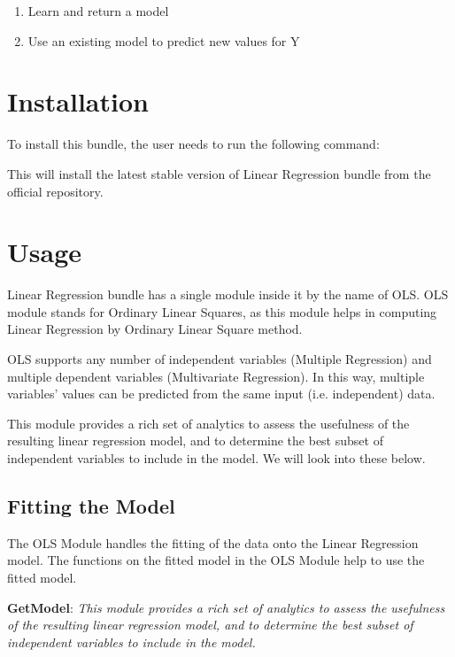 \begin{enumerate}
    \item Learn and return a model
    \item Use an existing model to predict new values for Y
\end{enumerate}

\section{Installation}

To install this bundle, the user needs to run the following command:



This will install the latest stable version of Linear Regression bundle from the official repository.

\section{Usage}

Linear Regression bundle has a single module inside it by the name of OLS. OLS module stands for Ordinary Linear Squares, as this module helps in computing Linear Regression by Ordinary Linear Square method.

OLS supports any number of independent variables (Multiple Regression) and multiple dependent variables (Multivariate Regression). In this way, multiple variables’ values can be predicted from the same input (i.e. independent) data.

This module provides a rich set of analytics to assess the usefulness of the resulting linear regression model, and to determine the best subset of independent variables to include in the model. We will look into these below.

\pagebreak

\subsection{Fitting the Model}

The OLS Module handles the fitting of the data onto the Linear Regression model. The functions on the fitted model in the OLS Module help to use the fitted model. 

\textbf{GetModel}: \textit{This module provides a rich set of analytics to assess the usefulness of the resulting linear regression model, and to determine the best subset of independent variables to include in the model.}

